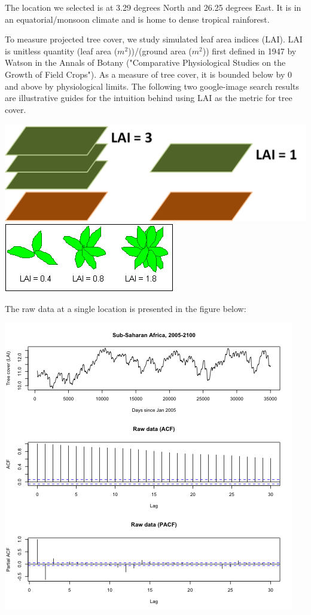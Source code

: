 \documentclass[11pt]{article}
\begin{document}
The location we selected is at 3.29 degrees North and 26.25 degrees East. It is
in an equatorial/monsoon climate and is home to dense tropical rainforest.

To measure projected tree cover, we study simulated leaf area indices (LAI). LAI
is unitless quantity (leaf area ($m^2$))/(ground area ($m^2$)) first defined in
1947 by Watson in the Annals of Botany ("Comparative Physiological Studies on
the Growth of Field Crops"). As a measure of tree cover, it is bounded below by
0 and above by physiological limits. The following two google-image search
results are illustrative guides for the intuition behind using LAI as the metric
for tree cover.

\includegraphics[width=\textwidth]{../img/lai.png}\\
\includegraphics[width=\textwidth]{../img/lai2.png}

The raw data at a single location is presented in the figure below:

\includegraphics[width=\textwidth]{../img/pacf_acf_raw.png}
\end{document}
